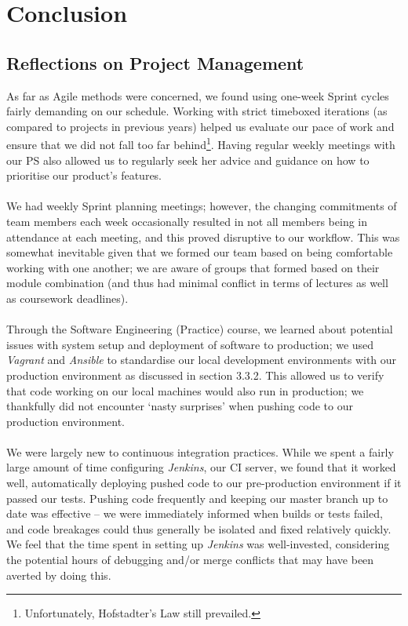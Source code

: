 \documentclass[a4paper, 10pt]{report}
\begin{document}
\chapter{Conclusion}
\section{Reflections on Project Management}
As far as Agile methods were concerned, we found using one-week Sprint cycles fairly demanding on our schedule. Working with strict timeboxed iterations (as compared to projects in previous years) helped us evaluate our pace of work and ensure that we did not fall too far behind\footnote{Unfortunately, Hofstadter's Law \cite{hofstadter} still prevailed.}. Having regular weekly meetings with our PS also allowed us to regularly seek her advice and guidance on how to prioritise our product's features.
\\\\
We had weekly Sprint planning meetings; however, the changing commitments of team members each week occasionally resulted in not all members being in attendance at each meeting, and this proved disruptive to our workflow. This was somewhat inevitable given that we formed our team based on being comfortable working with one another; we are aware of groups that formed based on their module combination (and thus had minimal conflict in terms of lectures as well as coursework deadlines).
\\\\
Through the Software Engineering (Practice) course, we learned about potential issues with system setup and deployment of software to production; we used \textit{Vagrant} and \textit{Ansible} to standardise our local development environments with our production environment as discussed in section 3.3.2. This allowed us to verify that code working on our local machines would also run in production; we thankfully did not encounter `nasty surprises' when pushing code to our production environment.
\\\\
We were largely new to continuous integration practices. While we spent a fairly large amount of time configuring \textit{Jenkins}, our CI server, we found that it worked well, automatically deploying pushed code to our pre-production environment if it passed our tests. Pushing code frequently and keeping our master branch up to date was effective -- we were immediately informed when builds or tests failed, and code breakages could thus generally be isolated and fixed relatively quickly. We feel that the time spent in setting up \textit{Jenkins} was well-invested, considering the potential hours of debugging and/or merge conflicts that may have been averted by doing this.
\end{document}

